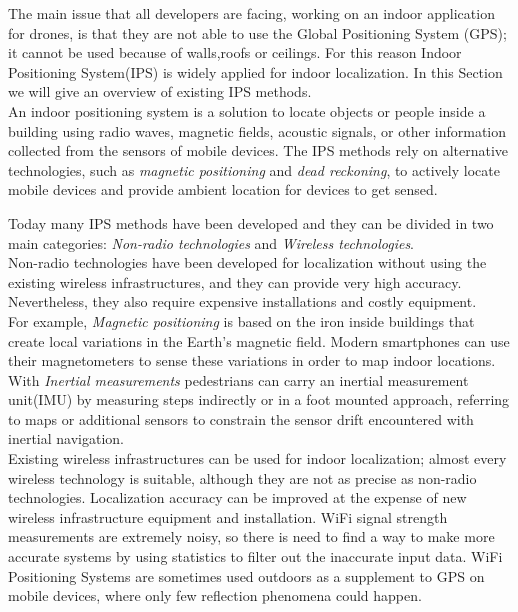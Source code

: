 The main issue that all developers are facing, working on an indoor application for drones, is that they are not able to use the Global Positioning System (GPS); it cannot be used because of walls,roofs or ceilings.
For this reason Indoor Positioning System(IPS) is widely applied for indoor localization. In this Section we will give an overview of existing IPS methods.  
\\

An indoor positioning system is a solution to locate objects or people inside a building using radio waves, magnetic fields, acoustic signals, or other information collected from the sensors of mobile devices.
The IPS methods rely on alternative technologies, such as \textit{magnetic positioning} and \textit{dead reckoning}, to actively locate mobile devices and provide ambient location for devices to get sensed.

Today many IPS methods have been developed and they can be divided in two main categories: \textit{Non-radio technologies} and \textit{Wireless technologies}.
\\

Non-radio technologies have been developed for localization without using the existing wireless infrastructures, and they can provide very high accuracy.
Nevertheless, they also require expensive installations and costly equipment.
\\

For example, \textit{Magnetic positioning}\cite{magnetic} is based on the iron inside buildings that create local variations in the Earth’s magnetic field.
Modern smartphones can use their magnetometers to sense these variations in order to map indoor locations.
\\

With \textit{Inertial measurements}\cite{IMU} pedestrians can carry an inertial measurement unit(IMU) by measuring steps indirectly or in a foot mounted approach, referring to maps or additional sensors to constrain the sensor drift encountered with inertial navigation.
\\

Existing wireless infrastructures can be used for indoor localization; almost every wireless technology is suitable, although they are not as precise as non-radio technologies.
Localization accuracy can be improved at the expense of new wireless infrastructure equipment and installation.
WiFi signal strength measurements are extremely noisy, so there is need to find a way to make more accurate systems by using statistics to filter out the inaccurate input data. WiFi Positioning Systems are sometimes used outdoors as a supplement to GPS on mobile devices, where only few reflection phenomena could happen.
\\

